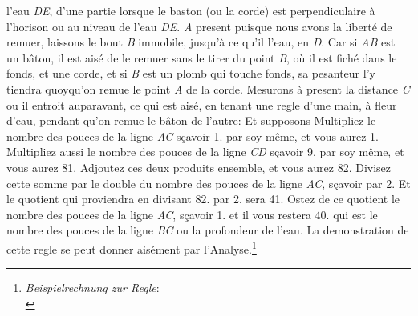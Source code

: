       l'eau \textit{DE}, d'une partie \textit{} lorsque le baston (ou la corde) est perpendiculaire \`{a} l'horison ou au niveau de l'eau \textit{DE}. \textit{A} present puisque nous avons la libert\'{e} de remuer, laissons le bout \textit{B} immobile,  jusqu'\`{a} ce qu'il  l'eau, en \textit{D}. Car si \textit{AB} est un bâton, il est ais\'{e} de le remuer sans le tirer du point \textit{B}, o\`{u} il est fich\'{e} dans le fonds, et  une corde, et si \textit{B} est un plomb qui touche fonds, sa pesanteur l'y tiendra quoyqu'on remue le point \textit{A} de la corde. Mesurons \`{a} present la distance  \textit{C} ou il entroit auparavant, ce qui est ais\'{e}, en tenant une regle d'une main, \`{a} fleur d'eau, pendant qu'on remue le bâton de l'autre: Et supposons  \pend \vspace{2.0ex} \pstart \centering  {} \pend \vspace{1.0ex}\pstart Multipliez le nombre des pouces de la ligne \textit{AC} s\c{c}avoir 1. par soy même, et vous aurez 1. Multipliez aussi le nombre des pouces de la ligne \textit{CD} s\c{c}avoir 9. par soy même, et vous aurez 81. Adjoutez ces deux produits ensemble, et vous aurez 82. Divisez cette somme par le double du nombre des pouces de la ligne \textit{AC}, s\c{c}avoir par 2. Et le quotient qui proviendra en divisant 82. par 2. sera 41. Ostez de ce quotient le nombre des pouces de la ligne \textit{AC}, s\c{c}avoir 1. et il vous restera 40. qui est le nombre des pouces de la ligne \textit{BC} ou la profondeur de l'eau. La demonstration de cette regle se peut donner ais\'{e}ment par l'Analyse.\footnote{\textit{Beispielrechnung zur Regle}:\\
}
